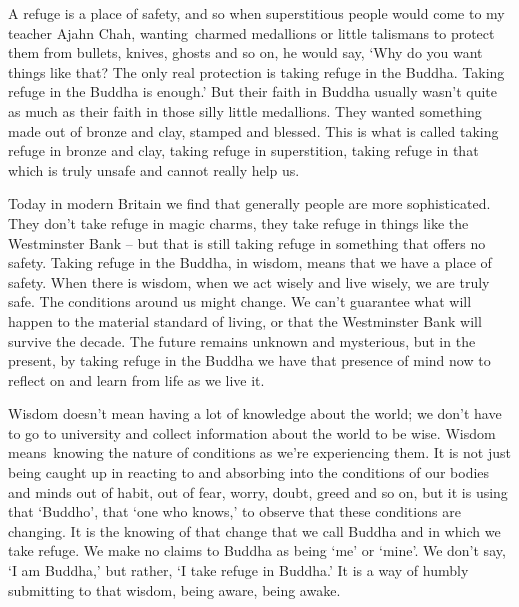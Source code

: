 A refuge is a place of safety, and so when superstitious people would come to my teacher Ajahn Chah, wanting\linebreak\ charmed medallions or little talismans to protect them from bullets, knives, ghosts and so on, he would say, `Why do you want things like that? The only real protection is taking refuge in the Buddha. Taking refuge in the Buddha is enough.' But their faith in Buddha usually wasn't quite as much as their faith in those silly little medallions. They wanted something made out of bronze and clay, stamped and blessed. This is what is called taking refuge in bronze and clay, taking refuge in superstition, taking refuge in that which is truly unsafe and cannot really help us.

Today in modern Britain we find that generally people are more sophisticated. They don't take refuge in magic charms, they take refuge in things like the Westminster Bank -- but that is still taking refuge in something that offers no safety. Taking refuge in the Buddha, in wisdom, means that we have a place of safety. When there is wisdom, when we act wisely and live wisely, we are truly safe. The conditions around us might change. We can't guarantee what will happen to the material standard of living, or that the Westminster Bank will survive the decade. The future remains unknown and mysterious, but in the present, by taking refuge in the Buddha we have that presence of mind now to reflect on and learn from life as we live it.

Wisdom doesn't mean having a lot of knowledge about the world; we don't have to go to university and collect information about the world to be wise. Wisdom means\linebreak\ knowing the nature of conditions as we're experiencing them. It is not just being caught up in reacting to and absorbing into the conditions of our bodies and minds out of habit, out of fear, worry, doubt, greed and so on, but it is using that `Buddho', that `one who knows,' to observe that these conditions are changing. It is the knowing of that change that we call Buddha and in which we take refuge. We make no claims to Buddha as being `me' or `mine'. We don't say, `I am Buddha,' but rather, `I take refuge in Buddha.' It is a way of humbly submitting to that wisdom, being aware, being awake.

